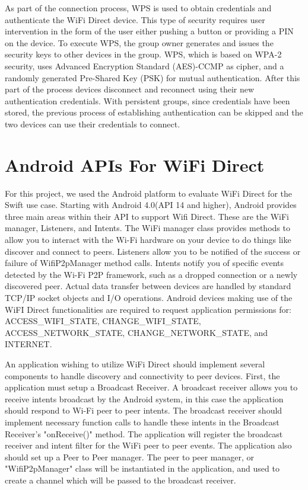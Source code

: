 \documentclass[10pt,twocolumn]{article}
\begin{document}
As part of the connection process, WPS is used to obtain credentials and authenticate the WiFi Direct device.  
This type of security requires user intervention in the form of the user either pushing a button or providing a PIN on the device.
To execute WPS, the group owner generates and issues the security keys to other devices in the group. 
WPS, which is based on WPA-2 security, uses Advanced Encryption Standard (AES)-CCMP as cipher, and a randomly generated Pre-Shared Key (PSK) for mutual authentication\cite{wifiwhitepaper}.
After this part of the process devices disconnect and reconnect using their new authentication credentials.
With persistent groups, since credentials have been stored, the previous process of establishing authentication can be skipped and the two devices can use their credentials to connect.

\section{Android APIs For WiFi Direct}
For this project, we used the Android platform to evaluate WiFi Direct for the Swift use case.
Starting with Android 4.0(API 14 and higher), Android provides three main areas within their API to support Wifi Direct.
These are the WiFi manager, Listeners, and Intents.
The WiFi manager class provides methods to allow you to interact with the Wi-Fi hardware on your device to do things like discover and connect to peers. 
Listeners allow you to be notified of the success or failure of WifiP2pManager method calls. 
Intents notify you of specific events detected by the Wi-Fi P2P framework, such as a dropped connection or a newly discovered peer. 
Actual data transfer between devices are handled by standard TCP/IP socket objects and I/O operations.
Android devices making use of the WiFI Direct functionalities are required to request application permissions for: ACCESS\_WIFI\_STATE, CHANGE\_WIFI\_STATE, ACCESS\_NETWORK\_STATE, CHANGE\_NETWORK\_STATE, and INTERNET. \cite{androidoverview}

An application wishing to utilize WiFi Direct should implement several components to handle discovery and connectivity to peer devices.
First, the application must setup a Broadcast Receiver. 
A broadcast receiver allows you to receive intents broadcast by the Android system, in this case the application should respond to Wi-Fi peer to peer intents.
The broadcast receiver should implement necessary function calls to handle these intents in the Broadcast Receiver's "onReceive()" method.
The application will register the broadcast receiver and intent filter for the WiFi peer to peer events.
The application also should set up a Peer to Peer manager. 
The peer to peer manager, or "WifiP2pManager" class will be instantiated in the application, and used to create a channel which will be passed to the broadcast receiver.
\end{document}
